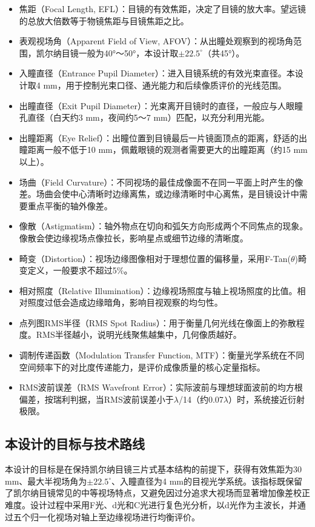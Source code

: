 \begin{itemize}
\item
  焦距（Focal Length, EFL）：目镜的有效焦距，决定了目镜的放大率。望远镜的总放大倍数等于物镜焦距与目镜焦距之比。
\item
  表观视场角（Apparent Field of View, AFOV）：从出瞳处观察到的视场角范围，凯尔纳目镜一般为40°～50°，本设计取\(\pm 22.5^\circ\)（共45°）。
\item
  入瞳直径（Entrance Pupil Diameter）：进入目镜系统的有效光束直径。本设计取4 mm，用于控制光束口径、通光能力和后续像质评价的光线范围。
\item
  出瞳直径（Exit Pupil Diameter）：光束离开目镜时的直径，一般应与人眼瞳孔直径（白天约3 mm，夜间约5～7 mm）匹配，以充分利用光能。
\item
  出瞳距离（Eye Relief）：出瞳位置到目镜最后一片镜面顶点的距离，舒适的出瞳距离一般不低于10 mm，佩戴眼镜的观测者需要更大的出瞳距离（约15 mm以上）。
\item
  场曲（Field Curvature）：不同视场的最佳成像面不在同一平面上时产生的像差。场曲会使中心清晰时边缘离焦，或边缘清晰时中心离焦，是目镜设计中需要重点平衡的轴外像差。
\item
  像散（Astigmatism）：轴外物点在切向和弧矢方向形成两个不同焦点的现象。像散会使边缘视场点像拉长，影响星点或细节边缘的清晰度。
\item
  畸变（Distortion）：视场边缘图像相对于理想位置的偏移量，采用F-Tan(\(\theta\))畸变定义，一般要求不超过5\%。
\item
  相对照度（Relative Illumination）：边缘视场照度与轴上视场照度的比值。相对照度过低会造成边缘暗角，影响目视观察的均匀性。
\item
  点列图RMS半径（RMS Spot Radius）：用于衡量几何光线在像面上的弥散程度。RMS半径越小，说明光线聚焦越集中，几何像质越好。
\item
  调制传递函数（Modulation Transfer Function, MTF）：衡量光学系统在不同空间频率下的对比度传递能力，是评价成像质量的核心定量指标。
\item
  RMS波前误差（RMS Wavefront Error）：实际波前与理想球面波前的均方根偏差，按瑞利判据，当RMS波前误差小于\(\lambda\)/14（约0.07\(\lambda\)）时，系统接近衍射极限。
\end{itemize}

\subsection{本设计的目标与技术路线}

本设计的目标是在保持凯尔纳目镜三片式基本结构的前提下，获得有效焦距为30 mm、最大半视场角为\(\pm 22.5^\circ\)、入瞳直径为4 mm的目视光学系统。该指标既保留了凯尔纳目镜常见的中等视场特点，又避免因过分追求大视场而显著增加像差校正难度。设计过程中采用F光、d光和C光进行复色光分析，以d光作为主波长，并通过五个归一化视场对轴上至边缘视场进行均衡评价。

